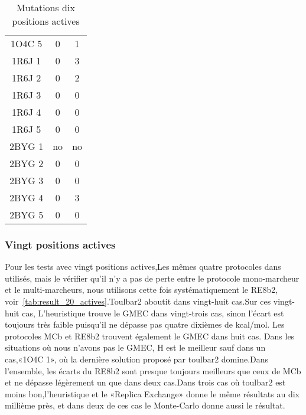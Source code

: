 \begin{table}[h]
{\begin{tabular}{ccc}
        1O4C 5 & 0  & 1 \\
        1R6J 1 & 0  & 3 \\
        1R6J 2 & 0  & 2 \\
        1R6J 3 & 0  & 0 \\
        1R6J 4 & 0  & 0 \\
        1R6J 5 & 0  & 0 \\
        2BYG 1 & no & no \\ 
        2BYG 2 & 0  & 0 \\
        2BYG 3 & 0  & 0 \\
        2BYG 4 & 0  & 3 \\
        2BYG 5 & 0  & 0 \\        
        \bottomrule

 \end{tabular}      
}
 \caption{Mutations dix positions actives }
\label{tab:mutations_10_actives}
\end{table}

   \subsubsection{Vingt positions actives }

Pour les  tests avec vingt positions actives,Les mêmes quatre protocoles dans utilisés, mais le vérifier qu'il n'y a pas de perte entre le protocole mono-marcheur et le multi-marcheurs, nous utilisons cette fois systématiquement le RE8b2, voir~\ref{tab:result_20_actives}.Toulbar2 aboutit dans vingt-huit cas.Sur ces vingt-huit cas, L'heuristique trouve le GMEC dans vingt-trois cas, sinon l'écart est toujours très faible puisqu'il ne dépasse pas quatre dixièmes de kcal/mol. Les protocoles MCb et RE8b2 trouvent également le GMEC dans huit cas. Dans les situations où nous n'avons pas le GMEC, H est le meilleur sauf dans un cas,«1O4C 1», où la dernière solution proposé par toulbar2 domine.Dans l'ensemble, les écarts du RE8b2 sont presque toujours meilleurs que ceux de MCb et ne dépasse légèrement un que dans deux cas.Dans trois cas où toulbar2 est moins bon,l'heuristique et le «Replica Exchange» donne le même résultats au dix millième près, et dans deux de ces cas le Monte-Carlo donne aussi le résultat.  

